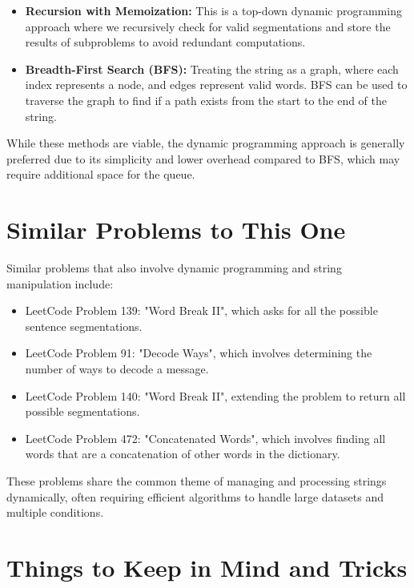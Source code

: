 \begin{itemize}
    \item \textbf{Recursion with Memoization:}  
    This is a top-down dynamic programming approach where we recursively check for valid segmentations and store the results of subproblems to avoid redundant computations.
    
    \item \textbf{Breadth-First Search (BFS):}  
    Treating the string as a graph, where each index represents a node, and edges represent valid words. BFS can be used to traverse the graph to find if a path exists from the start to the end of the string.
\end{itemize}

While these methods are viable, the dynamic programming approach is generally preferred due to its simplicity and lower overhead compared to BFS, which may require additional space for the queue.

\section*{Similar Problems to This One}

Similar problems that also involve dynamic programming and string manipulation include:

\begin{itemize}
    \item LeetCode Problem 139: "Word Break II", which asks for all the possible sentence segmentations.
    \item LeetCode Problem 91: "Decode Ways", which involves determining the number of ways to decode a message.
    \item LeetCode Problem 140: "Word Break II", extending the problem to return all possible segmentations.
    \item LeetCode Problem 472: "Concatenated Words", which involves finding all words that are a concatenation of other words in the dictionary.
\end{itemize}

These problems share the common theme of managing and processing strings dynamically, often requiring efficient algorithms to handle large datasets and multiple conditions.

\section*{Things to Keep in Mind and Tricks}

